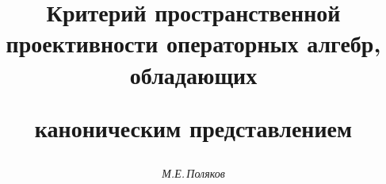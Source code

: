 \newcommand{\sumkk}{\sum\limits_{k \in J}}


\newcommand{\sumi}{\sum\limits_{i \in I}}


\newcommand{\nnn}{\bold N}


\newcommand{\summ}{\sum\limits_{m \in I}}


\newcommand{\sumrlrl}{\sum\limits_{n=r_{l-1}+1}^{r_l}}


\newcommand{\sumrl}{\sum\limits_{n=1}^{r_l}}


\newcommand{\sumrsrs}{\sum\limits_{n=r_{s-1}+1}^{r_s}}


\newcommand{\sumii}{\sum\limits_{m \in I}}


\newcommand{\si}{\sigma}


\newcommand{\dia}{\diamond}


\newcommand{\lan}{\langle}


\newcommand{\ran}{\rangle}


\newcommand{\cd}{\cdot}


\newcommand{\tts}[1]{}







\setcounter{page}{32}















\author{\it М.Е.\,Поляков}




\title{Критерий пространственной проективности операторных алгебр, обладающих


каноническим представлением}





\date{}




\pagestyle{plain} %







